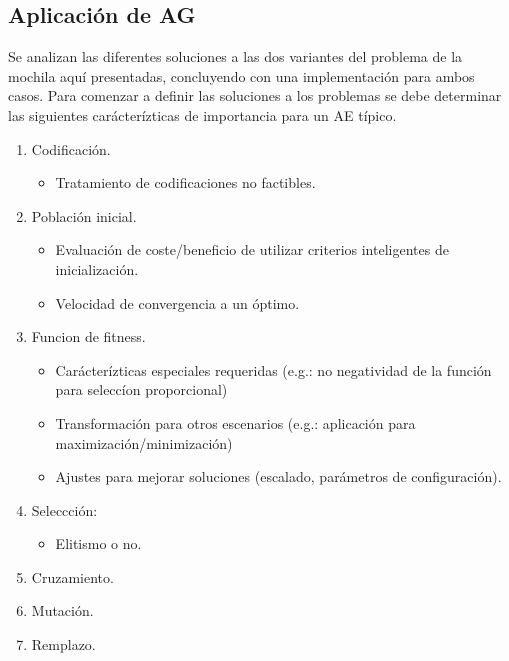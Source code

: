 \documentclass[9pt,conference]{IEEEtran}
\begin{document}
	\subsection{Aplicaci\'on de AG}

	Se analizan las diferentes soluciones a las dos variantes del problema de la mochila aqu\'i presentadas, concluyendo con una implementaci\'on para ambos casos.
	Para comenzar a definir las soluciones a los problemas se debe determinar las siguientes car\'acter\'izticas de importancia para un AE t\'ipico.

	\begin{enumerate}
		\item Codificaci\'on.
		\begin{itemize}
				\item Tratamiento de codificaciones no factibles.
		\end{itemize}
		\item Poblaci\'on inicial.
		\begin{itemize}
				\item  Evaluaci\'on de coste/beneficio de utilizar criterios inteligentes de inicializaci\'on.
				\item  Velocidad de convergencia a un \'optimo.
		\end{itemize}
		\item Funcion de fitness.
		\begin{itemize}
				\item  Car\'acter\'izticas especiales requeridas (e.g.: no negatividad de la funci\'on para selecc\'ion proporcional)
				\item  Transformaci\'on para otros escenarios (e.g.: aplicaci\'on para maximizaci\'on/minimizaci\'on)
				\item  Ajustes para mejorar soluciones (escalado, par\'ametros de configuraci\'on).
		\end{itemize}
		\item Seleccci\'on:
		\begin{itemize}
				\item  Elitismo o no.
		\end{itemize}
		\item Cruzamiento.
		\item Mutaci\'on.
		\item Remplazo.
	\end{enumerate}
\end{document}

